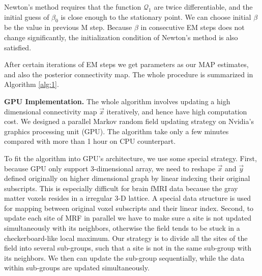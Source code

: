 \documentclass[12pt]{article}
\begin{document}
Newton's method requires that the function $\mathcal{Q}_1$ are twice
differentiable, and the initial guess of $\beta_0$ is close enough to
the stationary point. We can choose initial $\beta$ be the value in
previous M step. Because $\beta$ in consecutive EM steps does not
change significantly, the initialization condition of Newton's method
is also satisfied.

After certain iterations of EM steps we get parameters as our MAP
estimates, and also the posterior connectivity map. The whole
procedure is summarized in Algorithm \ref{alg:1}.

{\bf GPU Implementation.} The whole algorithm involves updating a high
dimensional connectivity map $\vec x$ iteratively, and hence have high
computation cost. We designed a parallel Markov random field updating strategy
on Nvidia's graphics processing unit (GPU). The algorithm take only a few minutes
compared with more than 1 hour on CPU counterpart.

To fit the algorithm into GPU's architecture, we use some special
strategy. First, because GPU only support 3-dimensional array, we need
to reshape $\vec x$ and $\vec y$ defined originally on higher
dimensional graph by linear indexing their original subscripts. This
is especially difficult for brain fMRI data because the gray matter
voxels resides in a irregular 3-D lattice. A special data structure is
used for mapping between original voxel subscripts and their linear
index. Second, to update each site of MRF in parallel we
have to make sure a site is not updated simultaneously with its
neighbors, otherwise the field tends to be stuck in a
checkerboard-like local maximum. Our strategy is to divide all the
sites of the field into several sub-groups, such that a site is not in
the same sub-group with its neighbors.  We then can update the
sub-group sequentially, while the data within sub-groups are updated
simultaneously. 
\end{document}
